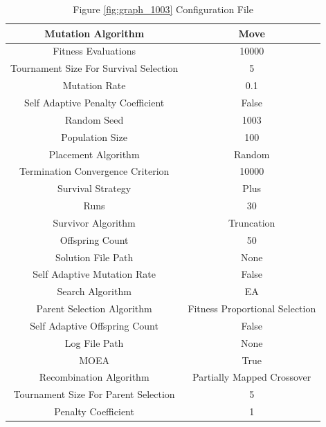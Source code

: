 \documentclass{standalone}
\begin{document}
\begin{table}[!htb]
	\centering
	\caption{Figure \ref{fig:graph_1003} Configuration File}
	\label{tab:graph_1003}
	\begin{tabular}{| c | c |}
		\hline
		Mutation Algorithm		& Move		 \\
		\hline
		Fitness Evaluations		& 10000		 \\
		\hline
		Tournament Size For Survival Selection		& 5		 \\
		\hline
		Mutation Rate		& 0.1		 \\
		\hline
		Self Adaptive Penalty Coefficient		& False		 \\
		\hline
		Random Seed		& 1003		 \\
		\hline
		Population Size		& 100		 \\
		\hline
		Placement Algorithm		& Random		 \\
		\hline
		Termination Convergence Criterion		& 10000		 \\
		\hline
		Survival Strategy		& Plus		 \\
		\hline
		Runs		& 30		 \\
		\hline
		Survivor Algorithm		& Truncation		 \\
		\hline
		Offspring Count		& 50		 \\
		\hline
		Solution File Path		& None		 \\
		\hline
		Self Adaptive Mutation Rate		& False		 \\
		\hline
		Search Algorithm		& EA		 \\
		\hline
		Parent Selection Algorithm		& Fitness Proportional Selection		 \\
		\hline
		Self Adaptive Offspring Count		& False		 \\
		\hline
		Log File Path		& None		 \\
		\hline
		MOEA		& True		 \\
		\hline
		Recombination Algorithm		& Partially Mapped Crossover		 \\
		\hline
		Tournament Size For Parent Selection		& 5		 \\
		\hline
		Penalty Coefficient		& 1		 \\
		\hline
	\end{tabular}
\end{table}
\end{document}
